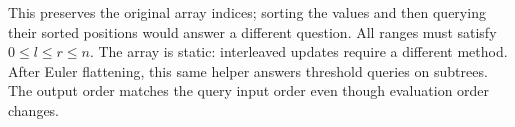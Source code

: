 This preserves the original array indices; sorting the values and then
querying their sorted positions would answer a different question. All
ranges must satisfy $0\le l\le r\le n$. The array is static: interleaved
updates require a different method. After Euler flattening, this same
helper answers threshold queries on subtrees. The output order matches
the query input order even though evaluation order changes.
